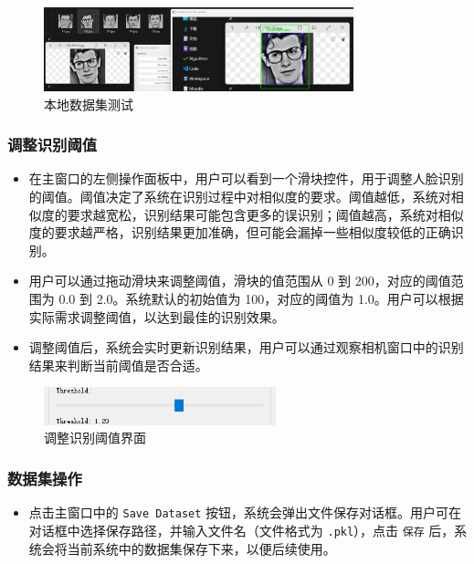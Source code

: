\documentclass{article}
\begin{document}
\begin{figure}[H]
    \centering
    \includegraphics[width=0.8\textwidth]{Img/PixPin_2025-03-09_11-11-17.png}
    \caption{本地数据集测试}
\end{figure}

\subsubsection{调整识别阈值}
\begin{itemize}
    \item 在主窗口的左侧操作面板中，用户可以看到一个滑块控件，用于调整人脸识别的阈值。阈值决定了系统在识别过程中对相似度的要求。阈值越低，系统对相似度的要求越宽松，识别结果可能包含更多的误识别；阈值越高，系统对相似度的要求越严格，识别结果更加准确，但可能会漏掉一些相似度较低的正确识别。
    \item 用户可以通过拖动滑块来调整阈值，滑块的值范围从 0 到 200，对应的阈值范围为 0.0 到 2.0。系统默认的初始值为 100，对应的阈值为 1.0。用户可以根据实际需求调整阈值，以达到最佳的识别效果。
    \item 调整阈值后，系统会实时更新识别结果，用户可以通过观察相机窗口中的识别结果来判断当前阈值是否合适。
\end{itemize}

\begin{figure}[H]
    \centering
    \includegraphics[width=0.6\textwidth]{Img/PixPin_2025-03-09_01-02-00.png}
    \caption{调整识别阈值界面}
\end{figure}

\subsubsection{数据集操作}
\begin{itemize}
    \item 点击主窗口中的 \texttt{Save Dataset} 按钮，系统会弹出文件保存对话框。用户可在对话框中选择保存路径，并输入文件名（文件格式为 \texttt{.pkl}），点击 \texttt{保存} 后，系统会将当前系统中的数据集保存下来，以便后续使用。
\end{itemize}
\end{document}
